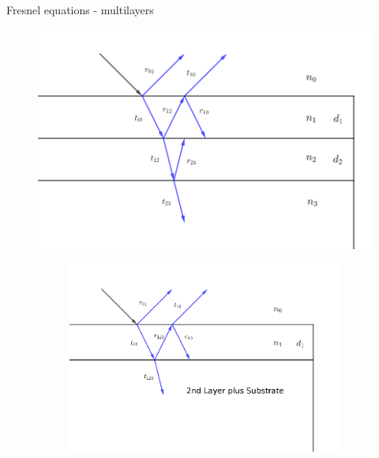 \documentclass[10pt]{beamer}
\begin{document}
	\begin{frame}{Fresnel equations - multilayers}
	
	\begin{figure}
	\centering
	\begin{minipage}{0.5\textwidth}
	\centering
	\includegraphics[scale=0.2]{figmulti1re.png}
	\end{minipage}\quad
	\begin{minipage}{0.5\textwidth}
	\begin{figure}
	\centering
	\includegraphics[scale=0.2]{figmulti2re.png}
	\end{figure}
	\end{minipage}
	\end{figure}
	
	\end{frame}
	
\end{document}
